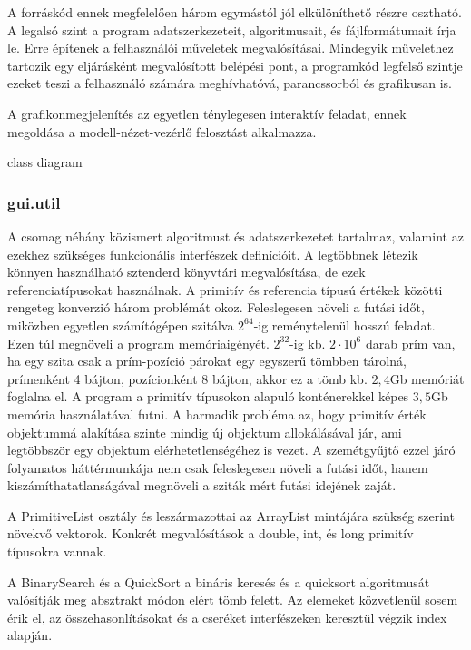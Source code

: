 A forráskód ennek megfelelően három egymástól jól elkülöníthető részre osztható.
A legalsó szint a program adatszerkezeteit, algoritmusait, és fájlformátumait írja le. 
Erre építenek a felhasználói műveletek megvalósításai.
Mindegyik művelethez tartozik egy eljárásként megvalósított belépési pont,
a programkód legfelső szintje ezeket teszi a felhasználó számára meghívhatóvá, parancssorból és grafikusan is.

A grafikonmegjelenítés az egyetlen ténylegesen interaktív feladat, ennek megoldása a modell-nézet-vezérlő felosztást alkalmazza.

{\color{red}class diagram}

\subsubsection{gui.util}

A csomag néhány közismert algoritmust és adatszerkezetet tartalmaz, valamint az ezekhez szükséges funkcionális interfészek definícióit.
A legtöbbnek létezik könnyen használható sztenderd könyvtári megvalósítása, de ezek referenciatípusokat használnak.
A primitív és referencia típusú értékek közötti rengeteg konverzió három problémát okoz.
Feleslegesen növeli a futási időt, miközben egyetlen számítógépen szitálva $2^{64}$-ig reménytelenül hosszú feladat.
Ezen túl megnöveli a program memóriaigényét.
$2^{32}$-ig kb. $2\cdot10^6$ darab prím van, ha egy szita csak a prím-pozíció párokat egy egyszerű tömbben tárolná, prímenként 4 bájton, pozícionként 8 bájton, akkor ez a tömb kb. $2,4$Gb memóriát foglalna el.
A program a primitív típusokon alapuló konténerekkel képes $3,5$Gb memória használatával futni.
A harmadik probléma az, hogy primitív érték objektummá alakítása szinte mindig új objektum allokálásával jár, ami legtöbbször egy objektum elérhetetlenségéhez is vezet.
A szemétgyűjtő ezzel járó folyamatos háttérmunkája nem csak feleslegesen növeli a futási időt, hanem kiszámíthatatlanságával megnöveli a sziták mért futási idejének zaját.

A PrimitiveList osztály és leszármazottai az ArrayList mintájára szükség szerint növekvő vektorok. Konkrét megvalósítások a double, int, és long primitív típusokra vannak.

A BinarySearch és a QuickSort a bináris keresés és a {\color{red}quicksort} algoritmusát valósítják meg absztrakt módon elért tömb felett. Az elemeket közvetlenül sosem érik el, az összehasonlításokat és a cseréket interfészeken keresztül végzik index alapján.


